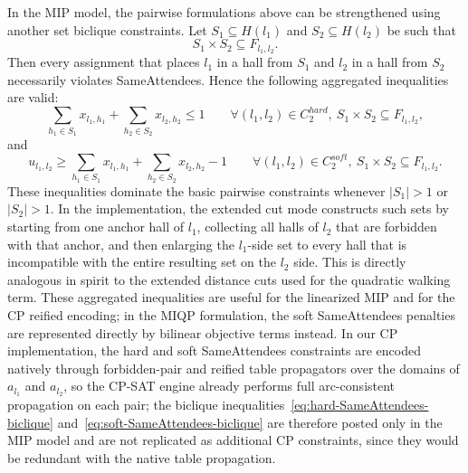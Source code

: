 \documentclass[11pt]{article}
\begin{document}
In the MIP model, the pairwise formulations above can be strengthened using another set biclique constraints. Let $S_1 \subseteq H(l_1)$ and $S_2 \subseteq H(l_2)$ be such that
\[
S_1 \times S_2 \subseteq F_{l_1,l_2}.
\]
Then every assignment that places $l_1$ in a hall from $S_1$ and $l_2$ in a hall from $S_2$ necessarily violates SameAttendees. Hence the following aggregated inequalities are valid:
\begin{equation}
	\label{eq:hard-SameAttendees-biclique}
	\sum_{h_1 \in S_1} x_{l_1,h_1} + \sum_{h_2 \in S_2} x_{l_2,h_2} \le 1
	\qquad \forall (l_1,l_2)\in C_2^{hard},\ S_1\times S_2 \subseteq F_{l_1,l_2},
\end{equation}
and
\begin{equation}
	\label{eq:soft-SameAttendees-biclique}
	u_{l_1,l_2} \ge \sum_{h_1 \in S_1} x_{l_1,h_1} + \sum_{h_2 \in S_2} x_{l_2,h_2} - 1
	\qquad \forall (l_1,l_2)\in C_2^{soft},\ S_1\times S_2 \subseteq F_{l_1,l_2}.
\end{equation}
These inequalities dominate the basic pairwise constraints whenever $|S_1|>1$ or $|S_2|>1$. In the implementation, the extended cut mode constructs such sets by starting from one anchor hall of $l_1$, collecting all halls of $l_2$ that are forbidden with that anchor, and then enlarging the $l_1$-side set to every hall that is incompatible with the entire resulting set on the $l_2$ side. This is directly analogous in spirit to the extended distance cuts used for the quadratic walking term. These aggregated inequalities are useful for the linearized MIP and for the CP reified encoding; in the MIQP formulation, the soft SameAttendees penalties are represented directly by bilinear objective terms instead. In our CP implementation, the hard and soft SameAttendees constraints are encoded natively through forbidden-pair and reified table propagators over the domains of $a_{l_1}$ and $a_{l_2}$, so the CP-SAT engine already performs full arc-consistent propagation on each pair; the biclique inequalities~\eqref{eq:hard-SameAttendees-biclique} and~\eqref{eq:soft-SameAttendees-biclique} are therefore posted only in the MIP model and are not replicated as additional CP constraints, since they would be redundant with the native table propagation.
\end{document}
